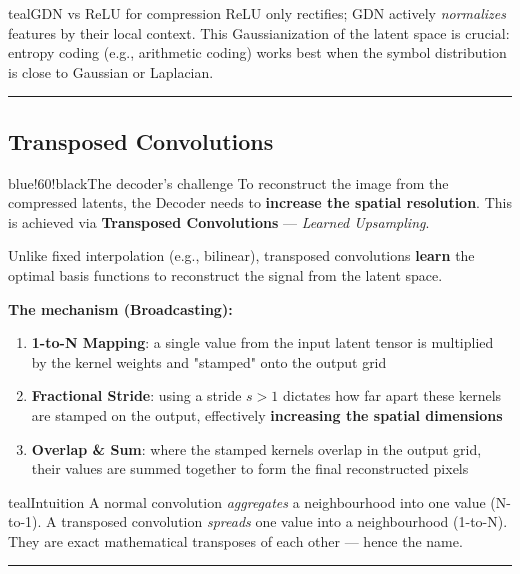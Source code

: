 \begin{calloutbox}{teal}{GDN vs ReLU for compression}
ReLU only rectifies; GDN actively \textit{normalizes} features by their local context. This Gaussianization of the latent space is crucial: entropy coding (e.g., arithmetic coding) works best when the symbol distribution is close to Gaussian or Laplacian.
\end{calloutbox}

\bigskip\hrule\bigskip

\subsection{Transposed Convolutions}

\begin{calloutbox}{blue!60!black}{The decoder's challenge}
To reconstruct the image from the compressed latents, the Decoder needs to \textbf{increase the spatial resolution}. This is achieved via \textbf{Transposed Convolutions} — \textit{Learned Upsampling}.

Unlike fixed interpolation (e.g., bilinear), transposed convolutions \textbf{learn} the optimal basis functions to reconstruct the signal from the latent space.
\end{calloutbox}

\textbf{The mechanism (Broadcasting):}

\begin{enumerate}
\item \textbf{1-to-N Mapping}: a single value from the input latent tensor is multiplied by the kernel weights and "stamped" onto the output grid
\item \textbf{Fractional Stride}: using a stride $s > 1$ dictates how far apart these kernels are stamped on the output, effectively \textbf{increasing the spatial dimensions}
\item \textbf{Overlap \& Sum}: where the stamped kernels overlap in the output grid, their values are summed together to form the final reconstructed pixels
\end{enumerate}

\begin{calloutbox}{teal}{Intuition}
A normal convolution \textit{aggregates} a neighbourhood into one value (N-to-1). A transposed convolution \textit{spreads} one value into a neighbourhood (1-to-N). They are exact mathematical transposes of each other — hence the name.
\end{calloutbox}

\bigskip\hrule\bigskip

